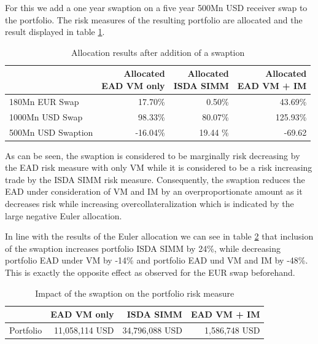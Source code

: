 \documentclass[../Thesis_AHoecherl.tex]{subfiles}
\begin{document}
    For this we add a one year swaption on a five year 500Mn USD receiver swap to the portfolio. The risk measures of the resulting portfolio are allocated and the result displayed in table \ref{tab:3TradeRatesAllocation}. 

    \begin{table}[htbp]
        \centering
        \begin{tabular}{l||r|r|r}
                & \makecell{Allocated \\ \gls{EAD} \gls{VM} only} &\makecell{Allocated \\ \gls{ISDA SIMM}} &\makecell{Allocated \\ \gls{EAD} \gls{VM} + IM} \\
                \toprule
        180Mn EUR Swap & 17.70\% & 0.50\% & 43.69\% \\
        1000Mn USD Swap & 98.33\% & 80.07\% & 125.93\% \\
        500Mn USD Swaption & -16.04\% & 19.44 \% & -69.62\\
        \end{tabular}%
        \caption{Allocation results after addition of a swaption}
        \label{tab:3TradeRatesAllocation}%
    \end{table}%
    As can be seen, the swaption is considered to be marginally risk decreasing by the \gls{EAD} risk measure with only \gls{VM} while it is considered to be a risk increasing trade by the \gls{ISDA SIMM} risk measure. Consequently, the swaption reduces the \gls{EAD} under consideration of \gls{VM} and \gls{IM} by an overproportionate amount as it decreases risk while increasing overcollateralization which is indicated by the large negative Euler allocation.

    In line with the results of the Euler allocation we can see in table \ref{tab:3TradeRatesResults} that inclusion of the swaption increases portfolio \gls{ISDA SIMM} by 24\%, while decreasing portfolio \gls{EAD} under \gls{VM} by -14\% and portfolio \gls{EAD} und \gls{VM} and \gls{IM} by -48\%. This is exactly the opposite effect as observed for the EUR swap beforehand.

    \begin{table}[htbp]
        \centering
        \begin{tabular}{l||r|r|r}
                & \gls{EAD} \gls{VM} only &\gls{ISDA SIMM} & \gls{EAD} \gls{VM} + \gls{IM} \\
                \toprule
        Portfolio & 11,058,114 USD & 34,796,088 USD & 1,586,748 USD \\
        \end{tabular}%
        \caption{Impact of the swaption on the portfolio risk measure}
        \label{tab:3TradeRatesResults}%
    \end{table}%
\end{document}

